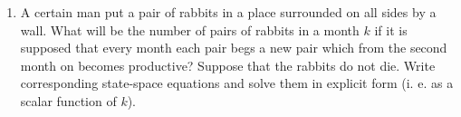 \documentclass[10pt]{article} %
\begin{document}
\begin{enumerate}
\item A certain man put a pair of rabbits in a place surrounded on all sides by a wall.
What will be the number of pairs of rabbits in a month $k$ if it is supposed that every month each pair begs a new pair which from the second month
on becomes productive? Suppose that the rabbits do not die. Write corresponding state-space equations and solve them in explicit form (i. e. as a scalar function of $k$).

\end{enumerate}
\end{document}
